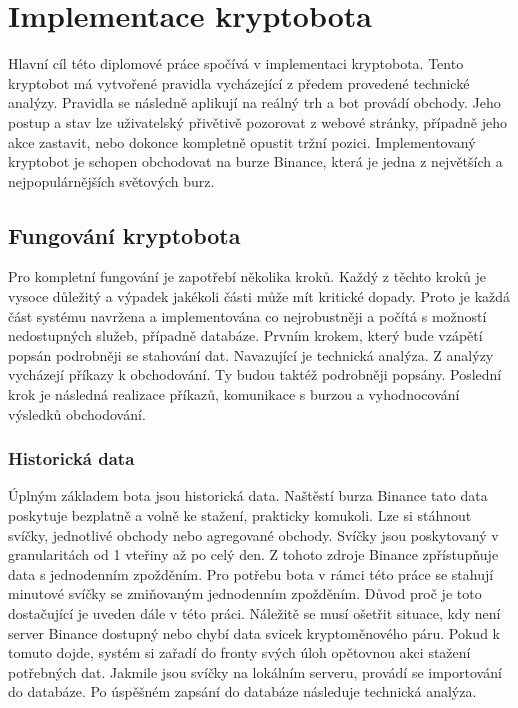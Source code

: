 \chapter{Implementace kryptobota}
\label{chap:impl}

Hlavní cíl této diplomové práce spočívá v implementaci kryptobota. Tento kryptobot má vytvořené pravidla vycházející z předem provedené technické analýzy.
Pravidla se následně aplikují na reálný trh a bot provádí obchody. Jeho postup a stav lze uživatelský přivětivě pozorovat z webové stránky, případně jeho akce
zastavit, nebo dokonce kompletně opustit tržní pozici. Implementovaný kryptobot je schopen obchodovat na burze Binance, která je jedna z největších a nejpopulárnějších
světových burz.

\section{Fungování kryptobota}
Pro kompletní fungování je zapotřebí několika kroků. Každý z těchto kroků je vysoce důležitý a výpadek jakékoli části může mít kritické dopady. Proto je každá část systému navržena
a implementována co nejrobustněji a počítá s možností nedostupných služeb, případně databáze. Prvním krokem, který bude vzápětí popsán podrobněji se stahování dat. Navazující
je technická analýza. Z analýzy vycházejí příkazy k obchodování. Ty budou taktéž podrobněji popsány. Poslední krok je následná realizace příkazů, komunikace s burzou
a vyhodnocování výsledků obchodování.

\subsection{Historická data}
Úplným základem bota jsou historická data. Naštěstí burza Binance tato data poskytuje bezplatně a volně ke stažení, prakticky komukoli. Lze si stáhnout svíčky,
jednotlivé obchody nebo agregované obchody. Svíčky jsou poskytovaný v granularitách od 1 vteřiny až po celý den. Z tohoto zdroje Binance zpřístupňuje data s jednodenním
zpožděním. Pro potřebu bota v rámci této práce se stahují minutové svíčky se zmiňovaným jednodenním zpožděním. Důvod proč je toto dostačující je uveden dále v této práci.
Náležitě se musí ošetřit situace, kdy není server Binance dostupný nebo chybí data svicek kryptoměnového páru. Pokud k tomuto dojde, systém si zařadí do fronty svých úloh opětovnou
akci stažení potřebných dat. Jakmile jsou svíčky na lokálním serveru, provádí se importování do databáze. Po úspěšném zapsání do databáze následuje technická analýza.

